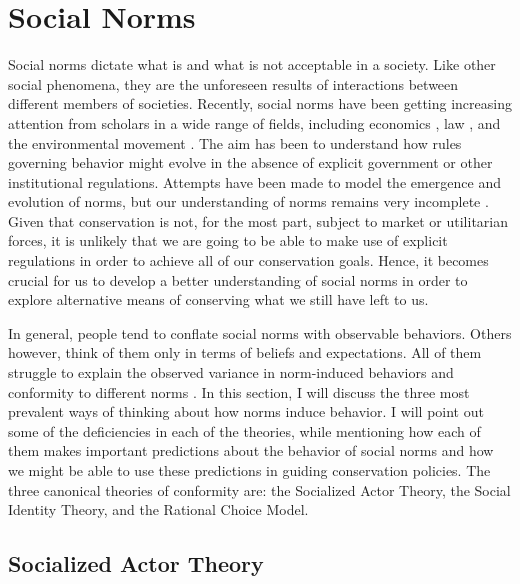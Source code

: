 \documentclass[rutwik_proposal.tex]{subfiles}
\begin{document}
\section{Social Norms}\label{sec:norms}

Social norms dictate what is and what is not acceptable in a society. Like other social phenomena, they are the unforeseen results of interactions between different members of societies. Recently, social norms have been getting increasing attention from scholars in a wide range of fields, including economics \cite{Young98}, law \cite{Ellickson91, Posner00}, and the environmental movement \cite{Kinzig13}. The aim has been to understand how rules governing behavior might evolve in the absence of explicit government or other institutional regulations. Attempts have been made to model the emergence and evolution of norms, but our understanding of norms remains very incomplete \cite{Levin11}. Given that conservation is not, for the most part, subject to market or utilitarian forces, it is unlikely that we are going to be able to make use of explicit regulations in order to achieve all of our conservation goals. Hence, it becomes crucial for us to develop a better understanding of social norms in order to explore alternative means of conserving what we still have left to us.

In general, people tend to conflate social norms with observable behaviors. Others however, think of them only in terms of beliefs and expectations. All of them struggle to explain the observed variance in norm-induced behaviors and conformity to different norms \cite{Bicchieri14}. In this section, I will discuss the three most prevalent ways of thinking about how norms induce behavior. I will point out some of the deficiencies in each of the theories, while mentioning how each of them makes important predictions about the behavior of social norms and how we might be able to use these predictions in guiding conservation policies. The three canonical theories of conformity are: the Socialized Actor Theory, the Social Identity Theory, and the Rational Choice Model.

\subsection{Socialized Actor Theory}\label{subsec:socialization}
\end{document}

